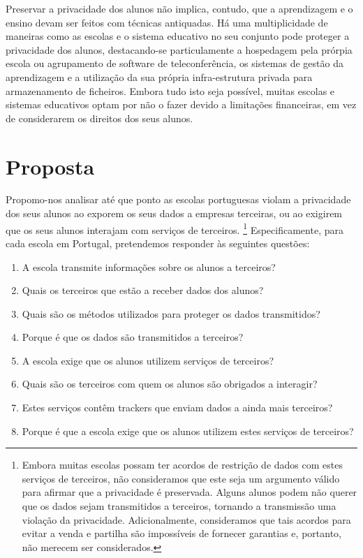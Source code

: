 \documentclass[twoside,twocolumn]{article}
\begin{document}
Preservar a privacidade dos alunos não implica, contudo, que a aprendizagem e o ensino devam ser feitos com técnicas antiquadas. Há uma multiplicidade de maneiras como as escolas e o sistema educativo no seu conjunto pode proteger a privacidade dos alunos, destacando-se particulamente a hospedagem pela prórpia escola ou agrupamento de software de teleconferência, os sistemas de gestão da aprendizagem e a utilização da sua própria infra-estrutura privada para armazenamento de ficheiros. Embora tudo isto seja possível, muitas escolas e sistemas educativos optam por não o fazer devido a limitações financeiras, em vez de considerarem os direitos dos seus alunos.


\section{Proposta}
\label{sec:proposal}

Propomo-nos analisar até que ponto as escolas portuguesas violam a privacidade dos seus alunos ao exporem os seus dados a empresas terceiras, ou ao exigirem que os seus alunos interajam com serviços de terceiros. \footnote{Embora muitas escolas possam ter acordos de restrição de dados com estes serviços de terceiros, não consideramos que este seja um argumento válido para afirmar que a privacidade é preservada. Alguns alunos podem não querer que os dados sejam transmitidos a terceiros, tornando a transmissão uma violação da privacidade. Adicionalmente, consideramos que tais acordos para evitar a venda e partilha são impossíveis de fornecer garantias e, portanto, não merecem ser considerados.} Especificamente, para cada escola em Portugal, pretendemos responder às seguintes questões:


\begin{enumerate}
\itemsep0em
\item A escola transmite informações sobre os alunos a terceiros?
\item Quais os terceiros que estão a receber dados dos alunos?
\item Quais são os métodos utilizados para proteger os dados transmitidos?
\item Porque é que os dados são transmitidos a terceiros?
\item A escola exige que os alunos utilizem serviços de terceiros?
\item Quais são os terceiros com quem os alunos são obrigados a interagir?
\item Estes serviços contêm trackers que enviam dados a ainda mais terceiros?
\item Porque é que a escola exige que os alunos utilizem estes serviços de terceiros?

\end{enumerate}
\end{document}
